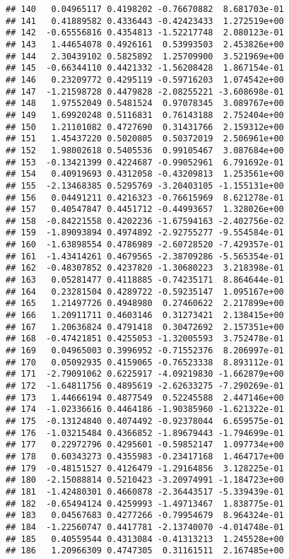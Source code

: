 \documentclass[
]{article}
\begin{document}
\begin{verbatim}
## 140   0.04965117 0.4198202 -0.76670882  8.681703e-01
## 141   0.41889582 0.4336443 -0.42423433  1.272519e+00
## 142  -0.65556816 0.4354813 -1.52217748  2.080123e-01
## 143   1.44654078 0.4926161  0.53993503  2.453826e+00
## 144   2.30439102 0.5825892  1.25709900  3.521969e+00
## 145  -0.66344110 0.4421332 -1.56208428  1.867154e-01
## 146   0.23209772 0.4295119 -0.59716203  1.074542e+00
## 147  -1.21598728 0.4479828 -2.08255221 -3.608698e-01
## 148   1.97552049 0.5481524  0.97078345  3.089767e+00
## 149   1.69920248 0.5116831  0.76143188  2.752404e+00
## 150   1.21101082 0.4727690  0.31431766  2.159312e+00
## 151   1.45437220 0.5020805  0.50372019  2.506961e+00
## 152   1.98002618 0.5405536  0.99105467  3.087684e+00
## 153  -0.13421399 0.4224687 -0.99052961  6.791692e-01
## 154   0.40919693 0.4312058 -0.43209813  1.253561e+00
## 155  -2.13468385 0.5295769 -3.20403105 -1.155131e+00
## 156   0.04491211 0.4216323 -0.76615969  8.621278e-01
## 157   0.40547847 0.4451712 -0.44993657  1.328026e+00
## 158  -0.84221558 0.4202236 -1.67594163 -2.402756e-02
## 159  -1.89093894 0.4974892 -2.92755277 -9.554584e-01
## 160  -1.63898554 0.4786989 -2.60728520 -7.429357e-01
## 161  -1.43414261 0.4679565 -2.38709286 -5.565354e-01
## 162  -0.48307852 0.4237820 -1.30680223  3.218398e-01
## 163   0.05281477 0.4118885 -0.74235171  8.864644e-01
## 164   0.23281504 0.4289722 -0.59235147  1.095167e+00
## 165   1.21497726 0.4948980  0.27460622  2.217899e+00
## 166   1.20911711 0.4603146  0.31273421  2.138415e+00
## 167   1.20636824 0.4791418  0.30472692  2.157351e+00
## 168  -0.47421851 0.4255053 -1.32005593  3.752478e-01
## 169   0.04965003 0.3996952 -0.71552376  8.206997e-01
## 170   0.05092935 0.4159065 -0.76523338  8.893112e-01
## 171  -2.79091062 0.6225917 -4.09219830 -1.662879e+00
## 172  -1.64811756 0.4895619 -2.62633275 -7.290269e-01
## 173   1.44666194 0.4877549  0.52245588  2.447146e+00
## 174  -1.02336616 0.4464186 -1.90385960 -1.621322e-01
## 175  -0.13124840 0.4074492 -0.92378044  6.659575e-01
## 176  -1.03215484 0.4366852 -1.89679443 -1.794699e-01
## 177   0.22972796 0.4295601 -0.59852147  1.097734e+00
## 178   0.60343273 0.4355983 -0.23417168  1.464717e+00
## 179  -0.48151527 0.4126479 -1.29164856  3.128225e-01
## 180  -2.15088814 0.5210423 -3.20974991 -1.184723e+00
## 181  -1.42480301 0.4660878 -2.36443517 -5.339439e-01
## 182  -0.65494124 0.4259993 -1.49713467  1.838775e-01
## 183   0.04567683 0.4277266 -0.79954679  8.964324e-01
## 184  -1.22560747 0.4417781 -2.13740070 -4.014748e-01
## 185   0.40559544 0.4313084 -0.41313213  1.245528e+00
## 186   1.20966309 0.4747305  0.31161511  2.167485e+00

\end{verbatim}
\end{document}
